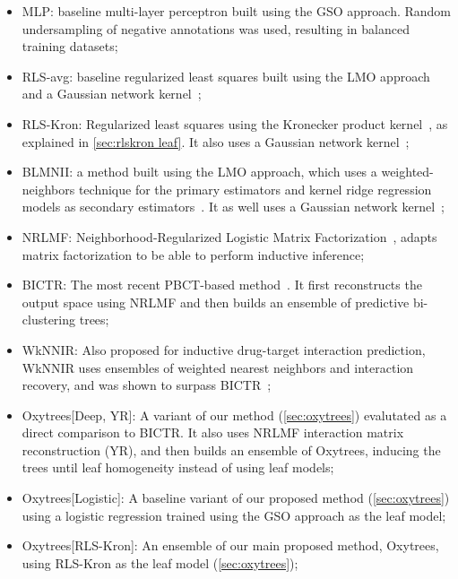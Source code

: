 \documentclass[sn-mathphys-num]{sn-jnl}%
\theoremstyle{thmstyleone}%
\theoremstyle{thmstyletwo}%
\theoremstyle{thmstylethree}%
\begin{document}
\begin{itemize}
\item MLP: baseline multi-layer perceptron built using the GSO approach. Random undersampling of negative annotations was used, resulting in balanced training datasets;

\item RLS-avg: baseline regularized least squares built using the LMO approach and a Gaussian network kernel~\cite{van_laarhoven_gaussian_2011};

\item RLS-Kron: Regularized least squares using the Kronecker product kernel~\cite{van_laarhoven_gaussian_nodate}, as explained in \autoref{sec:rlskron leaf}. It also uses a Gaussian network kernel~\cite{van_laarhoven_gaussian_2011};

\item BLMNII: a method built using the LMO approach, which uses a weighted-neighbors technique for the primary estimators and kernel ridge regression models as secondary estimators~\cite{mei2013drug}. It as well uses a Gaussian network kernel~\cite{van_laarhoven_gaussian_2011,mei2013drug};

\item NRLMF: Neighborhood-Regularized Logistic Matrix Factorization~\cite{liu_neighborhood_2016,liu_lpi-nrlmf_2017,liu_predicting_2020}, adapts matrix factorization to be able to perform inductive inference;

\item BICTR: The most recent PBCT-based method~\cite{pliakos_drug-target_2020}. It first reconstructs the output space using NRLMF and then builds an ensemble of predictive bi-clustering trees;

\item WkNNIR: Also proposed for inductive drug-target interaction prediction, WkNNIR uses ensembles of weighted nearest neighbors and interaction recovery, and was shown to surpass BICTR~\cite{liu_drug-target_2022};

\item Oxytrees[Deep, YR]: A variant of our method (\autoref{sec:oxytrees}) evalutated as a direct comparison to BICTR. It also uses NRLMF interaction matrix reconstruction (YR), and then builds an ensemble of Oxytrees, inducing the trees until leaf homogeneity instead of using leaf models;

\item Oxytrees[Logistic]: A baseline variant of our proposed method (\autoref{sec:oxytrees}) using a logistic regression trained using the GSO approach as the leaf model;

\item Oxytrees[RLS-Kron]: An ensemble of our main proposed method,  Oxytrees, using RLS-Kron as the leaf model (\autoref{sec:oxytrees});

\end{itemize}
\end{document}
